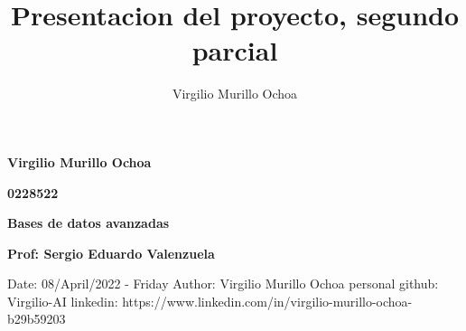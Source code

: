 \documentclass[15pt]{extarticle}
\title{Presentacion del proyecto, segundo parcial}
\author{Virgilio Murillo Ochoa}
\begin{document}
\begin{center}

	\huge\textbf{
		Virgilio Murillo Ochoa
	}\linebreak[4]

	\huge\textbf{
		0228522
	}\linebreak[4]

	\LARGE\textbf{
		Bases de datos avanzadas
	}\linebreak[4]

	\LARGE\textbf{
		Prof: Sergio Eduardo Valenzuela
	}\linebreak[4]
	\newline
	\newline
	\newline
	\newline
	\begin{LARGE}

		\color{blue}
		Date: 08/April/2022 - Friday
		Author: Virgilio Murillo Ochoa
		personal github: Virgilio-AI
		linkedin: https://www.linkedin.com/in/virgilio-murillo-ochoa-b29b59203
		\color{blue}

	\end{LARGE}
\end{center}
\newpage
\end{document}
